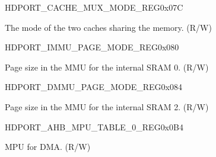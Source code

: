 \begin{register}{H}{DPORT\_CACHE\_MUX\_MODE\_REG}{0x07C}\label{regdesc:CACHEMUXMODEREG}
%
%
\regnewline%
\begin{regdesc}\begin{reglist}
\item [DPORT\_CACHE\_MUX\_MODE]The mode of the two caches sharing the memory. (R/W)
\end{reglist}\end{regdesc}
\end{register}


\begin{register}{H}{DPORT\_IMMU\_PAGE\_MODE\_REG}{0x080}\label{regdesc:IMMUPAGEMODEREG}
%
%
%
\regnewline%
\begin{regdesc}\begin{reglist}
\item [DPORT\_IMMU\_PAGE\_MODE]Page size in the MMU for the internal SRAM 0. (R/W)
\end{reglist}\end{regdesc}
\end{register}


\begin{register}{H}{DPORT\_DMMU\_PAGE\_MODE\_REG}{0x084}\label{regdesc:DMMUPAGEMODEREG}
%
%
%
\regnewline%
\begin{regdesc}\begin{reglist}
\item [DPORT\_DMMU\_PAGE\_MODE]Page size in the MMU for the internal SRAM 2. (R/W)
\end{reglist}\end{regdesc}
\end{register}




\begin{register}{H}{DPORT\_AHB\_MPU\_TABLE\_0\_REG}{0x0B4}\label{regdesc:AHBMPUTABLE0REG}
%
\regnewline%
\begin{regdesc}\begin{reglist}
\item [DPORT\_AHB\_MPU\_TABLE\_0\_REG]MPU for DMA. (R/W)
\end{reglist}\end{regdesc}
\end{register}


